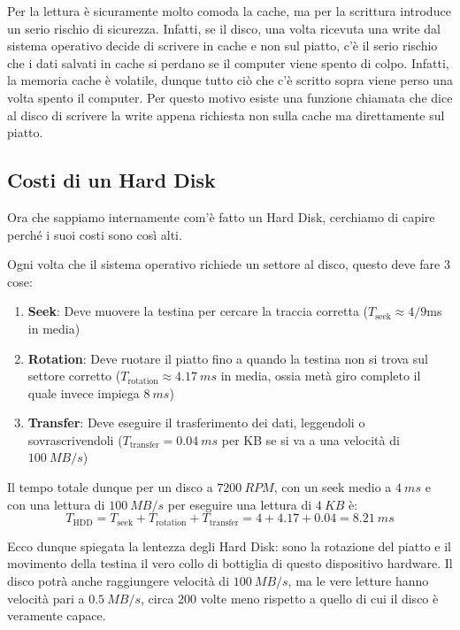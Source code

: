 \documentclass[11pt, a4paper, titlepage, oneside]{scrbook}
\begin{document}
Per la lettura è sicuramente molto comoda la cache, ma per la scrittura introduce un serio rischio di sicurezza. Infatti, se il disco, una volta ricevuta una write dal sistema operativo decide di scrivere in cache e non sul piatto, c'è il serio rischio che i dati salvati in cache si perdano se il computer viene spento di colpo. Infatti, la memoria cache è volatile, dunque tutto ciò che c'è scritto sopra viene perso una volta spento il computer. Per questo motivo esiste una funzione chiamata  che dice al disco di scrivere la write appena richiesta non sulla cache ma direttamente sul piatto. 

\subsection{Costi di un Hard Disk}

Ora che sappiamo internamente com'è fatto un Hard Disk, cerchiamo di capire perché i suoi costi sono così alti. 

Ogni volta che il sistema operativo richiede un settore al disco, questo deve fare 3 cose:
\begin{enumerate}[label=\arabic*°]
    \item \textbf{Seek}: Deve muovere la testina per cercare la traccia corretta ($T_{\text{seek}} \approx 4/9$ms in media)
    \item \textbf{Rotation}: Deve ruotare il piatto fino a quando la testina non si trova sul settore corretto ($T_{\text{rotation}} \approx \SI{4.17}{ms}$ in media, ossia metà giro completo il quale invece impiega $\SI{8}{ms}$)
    \item \textbf{Transfer}: Deve eseguire il trasferimento dei dati, leggendoli o sovrascrivendoli (\mbox{$T_{\text{transfer}} = \SI{0.04}{ms}$} per KB se si va a una velocità di $\SI{100}{MB/s}$)
\end{enumerate}

Il tempo totale dunque per un disco a $\SI{7200}{RPM}$, con un seek medio a $\SI{4}{ms}$ e con una lettura di $\SI{100}{MB/s}$ per eseguire una lettura di $\SI{4}{KB}$ è:
\[
T_{\text{HDD}} = T_{\text{seek}} + T_{\text{rotation}} + T_{\text{transfer}} = 4 + 4.17 + 0.04 = \SI{8.21}{ms}
\]

Ecco dunque spiegata la lentezza degli Hard Disk: sono la rotazione del piatto e il movimento della testina il vero collo di bottiglia di questo dispositivo hardware. Il disco potrà anche raggiungere velocità di $\SI{100}{MB/s}$, ma le vere letture hanno velocità pari a $\SI{0.5}{MB/s}$, circa 200 volte meno rispetto a quello di cui il disco è veramente capace.
\end{document}
